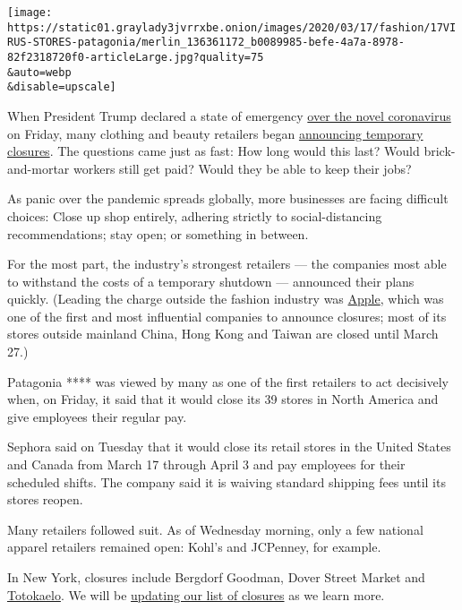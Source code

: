 \texttt{[image: https://static01.graylady3jvrrxbe.onion/images/2020/03/17/fashion/17VIRUS-STORES-patagonia/merlin\_136361172\_b0089985-befe-4a7a-8978-82f2318720f0-articleLarge.jpg?quality=75\\\&auto=webp\\\&disable=upscale]}

When President Trump declared a state of emergency
\href{https://www.nytimes3xbfgragh.onion/2020/03/17/world/coronavirus-news.html}{over
the novel coronavirus} on Friday, many clothing and beauty retailers
began
\href{https://www.nytimes3xbfgragh.onion/2020/03/18/style/coronavirus-clothing-beauty-stores-closed.html}{announcing
temporary closures}. The questions came just as fast: How long would
this last? Would brick-and-mortar workers still get paid? Would they be
able to keep their jobs?

As panic over the pandemic spreads globally, more businesses are facing
difficult choices: Close up shop entirely, adhering strictly to
social-distancing recommendations; stay open; or something in between.

For the most part, the industry's strongest retailers --- the companies
most able to withstand the costs of a temporary shutdown --- announced
their plans quickly. (Leading the charge outside the fashion industry
was
\href{https://www.nytimes3xbfgragh.onion/2020/03/14/technology/apple-stores-coronavirus.html}{Apple},
which was one of the first and most influential companies to announce
closures; most of its stores outside mainland China, Hong Kong and
Taiwan are closed until March 27.)

Patagonia **** was viewed by many as one of the first retailers to act
decisively when, on Friday, it said that it would close its 39 stores in
North America and give employees their regular pay.

Sephora said on Tuesday that it would close its retail stores in the
United States and Canada from March 17 through April 3 and pay employees
for their scheduled shifts. The company said it is waiving standard
shipping fees until its stores reopen.

Many retailers followed suit. As of Wednesday morning, only a few
national apparel retailers remained open: Kohl's and JCPenney, for
example.

In New York, closures include Bergdorf Goodman, Dover Street Market and
\href{https://www.nytimes3xbfgragh.onion/2017/10/03/fashion/190-bowery-jay-maisel-totokaelo-germania-bank.html}{Totokaelo}.
We will be
\href{https://www.buzzfeednews.com/article/stephaniemcneal/arielle-charnas-something-navy-has-coronavirus}{updating
our list of closures} as we learn more.

